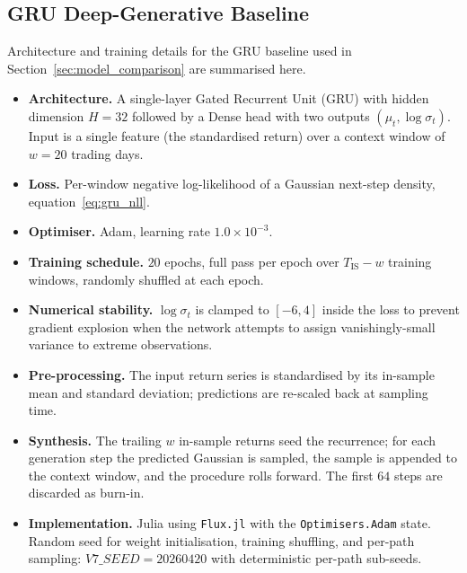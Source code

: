 \subsection{GRU Deep-Generative Baseline}
\label{sec:gru_supp}

Architecture and training details for the GRU baseline used in
Section~\ref{sec:model_comparison} are summarised here.

\begin{itemize}
    \item \textbf{Architecture.} A single-layer Gated Recurrent Unit (GRU)
    with hidden dimension $H = 32$ followed by a Dense head with two
    outputs $(\mu_t, \log \sigma_t)$. Input is a single feature (the
    standardised return) over a context window of $w = 20$ trading days.

    \item \textbf{Loss.} Per-window negative log-likelihood of a Gaussian
    next-step density, equation~\eqref{eq:gru_nll}.

    \item \textbf{Optimiser.} Adam, learning rate $1.0 \times 10^{-3}$.

    \item \textbf{Training schedule.} $20$ epochs, full pass per epoch
    over $T_{\text{IS}} - w$ training windows, randomly shuffled at each
    epoch.

    \item \textbf{Numerical stability.} $\log \sigma_t$ is clamped to
    $[-6, 4]$ inside the loss to prevent gradient explosion when the
    network attempts to assign vanishingly-small variance to extreme
    observations.

    \item \textbf{Pre-processing.} The input return series is standardised
    by its in-sample mean and standard deviation; predictions are
    re-scaled back at sampling time.

    \item \textbf{Synthesis.} The trailing $w$ in-sample returns seed the
    recurrence; for each generation step the predicted Gaussian is
    sampled, the sample is appended to the context window, and the
    procedure rolls forward. The first $64$ steps are discarded as
    burn-in.

    \item \textbf{Implementation.} Julia using \texttt{Flux.jl}
    \cite{innes2018flux} with the \texttt{Optimisers.Adam} state.
    Random seed for weight initialisation, training shuffling, and per-path
    sampling: $V7\_SEED = 20260420$ with deterministic per-path sub-seeds.
\end{itemize}

